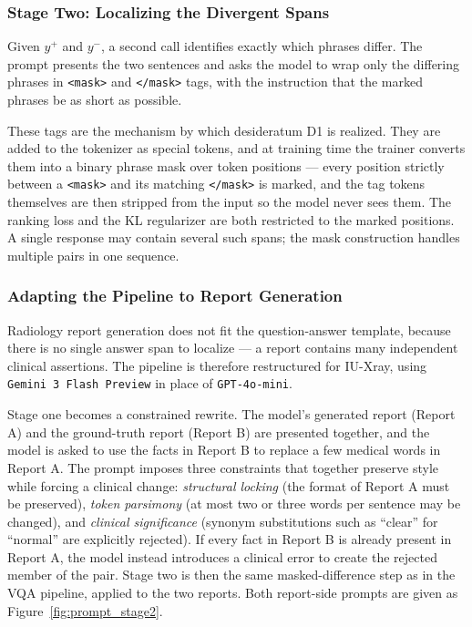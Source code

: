 \subsubsection{Stage Two: Localizing the Divergent Spans}

Given $y^+$ and $y^-$, a second call identifies exactly which phrases differ. The prompt presents the two sentences and asks the model to wrap only the differing phrases in \texttt{<mask>} and \texttt{</mask>} tags, with the instruction that the marked phrases be as short as possible.

These tags are the mechanism by which desideratum D1 is realized. They are added to the tokenizer as special tokens, and at training time the trainer converts them into a binary phrase mask over token positions --- every position strictly between a \texttt{<mask>} and its matching \texttt{</mask>} is marked, and the tag tokens themselves are then stripped from the input so the model never sees them. The ranking loss and the KL regularizer are both restricted to the marked positions. A single response may contain several such spans; the mask construction handles multiple pairs in one sequence.

\subsubsection{Adapting the Pipeline to Report Generation}

Radiology report generation does not fit the question-answer template, because there is no single answer span to localize --- a report contains many independent clinical assertions. The pipeline is therefore restructured for IU-Xray, using \texttt{Gemini 3 Flash Preview} in place of \texttt{GPT-4o-mini}.

Stage one becomes a constrained rewrite. The model's generated report (Report A) and the ground-truth report (Report B) are presented together, and the model is asked to use the facts in Report B to replace a few medical words in Report A. The prompt imposes three constraints that together preserve style while forcing a clinical change: \emph{structural locking} (the format of Report A must be preserved), \emph{token parsimony} (at most two or three words per sentence may be changed), and \emph{clinical significance} (synonym substitutions such as ``clear'' for ``normal'' are explicitly rejected). If every fact in Report B is already present in Report A, the model instead introduces a clinical error to create the rejected member of the pair. Stage two is then the same masked-difference step as in the VQA pipeline, applied to the two reports. Both report-side prompts are given as Figure~\ref{fig:prompt_stage2}.

